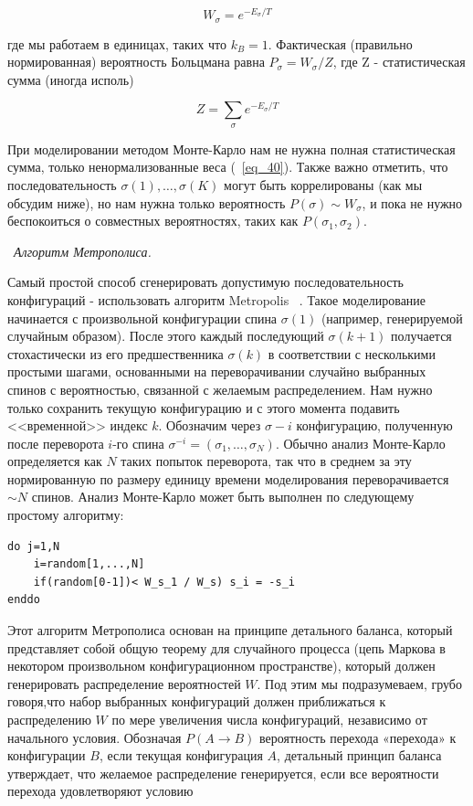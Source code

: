\documentclass[11pt]{article}
\begin{document}
\begin{equation}
W_\sigma=e^{-E_\sigma/T}
\label{eq_39}
\end{equation}

где мы работаем в единицах, таких что $k_B = 1$. Фактическая (правильно нормированная) вероятность Больцмана равна $P_\sigma = W_\sigma / Z$, где Z - статистическая сумма (иногда исполь)

\begin{equation}
Z=\sum\limits_\sigma e^{-E_\sigma / T}
\label{eq_41}
\end{equation}

При моделировании методом Монте-Карло нам не нужна полная статистическая сумма, только ненормализованные веса (~\ref{eq_40}). Также важно отметить, что последовательность $\sigma(1), \dots , \sigma(K)$ могут быть коррелированы (как мы обсудим ниже), но нам нужна только вероятность $P(\sigma) \sim  W_\sigma$, и пока не нужно беспокоиться о совместных вероятностях, таких как $P(\sigma_1,\sigma_2)$.

~\emph{Алгоритм Метрополиса.}

Самый простой способ сгенерировать допустимую последовательность конфигураций - использовать алгоритм Metropolis ~\cite{cp_21_1087}. Такое моделирование начинается с произвольной конфигурации спина $\sigma(1)$ (например, генерируемой случайным образом). После этого каждый последующий $\sigma(k + 1)$ получается стохастически из его предшественника $\sigma(k)$ в соответствии с несколькими простыми шагами, основанными на переворачивании случайно выбранных спинов с вероятностью, связанной с желаемым распределением. Нам нужно только сохранить текущую конфигурацию и с этого момента подавить <<временной>> индекс $k$. Обозначим через $\sigma −i$ конфигурацию, полученную после переворота $i$-го спина $\sigma^{-i}=(\sigma_1,\dots , \sigma_N)$. Обычно анализ Монте-Карло определяется как $N$ таких попыток переворота, так что в среднем за эту нормированную по размеру единицу времени моделирования переворачивается $\sim N$ спинов. Анализ Монте-Карло может быть выполнен по следующему простому алгоритму:

\begin{lstlisting}
do j=1,N
	i=random[1,...,N]
	if(random[0-1])< W_s_1 / W_s) s_i = -s_i
enddo	
\end{lstlisting}

Этот алгоритм Метрополиса основан на принципе детального баланса, который представляет собой общую теорему для случайного процесса (цепь Маркова в некотором произвольном конфигурационном пространстве), который должен генерировать распределение вероятностей $W$. Под этим мы подразумеваем, грубо говоря,что набор выбранных конфигураций должен приближаться к распределению $W$ по мере увеличения числа конфигураций, независимо от начального условия. Обозначая $P(A → B)$ вероятность перехода «перехода» к конфигурации $B$, если текущая конфигурация $A$, детальный принцип баланса утверждает, что желаемое распределение генерируется, если все вероятности перехода удовлетворяют условию
\end{document}
